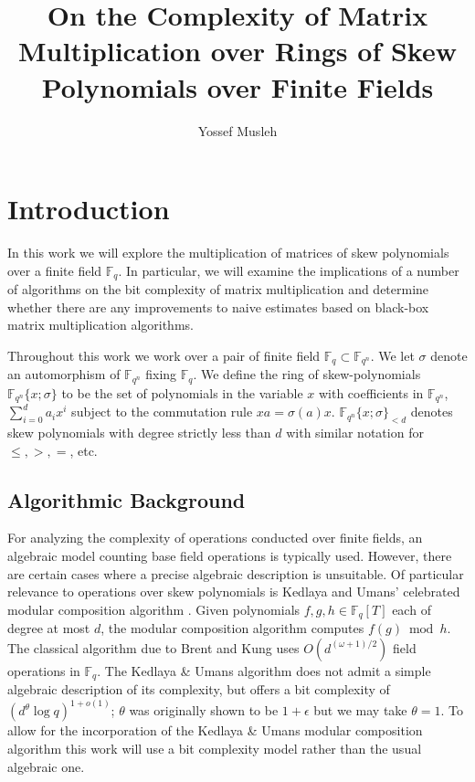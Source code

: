 \documentclass[9pt]{article}
\title{On the Complexity of Matrix Multiplication over Rings of Skew Polynomials over Finite Fields}
\author{Yossef Musleh}
\date{}
\theoremstyle{plain}
\theoremstyle{definition}
\theoremstyle{remark}
\newcommand{\F}{\mathbb{F}}
\newcommand{\sring}{\F_{q^n}\{x; \sigma\}}
\begin{document}
\maketitle

\section{Introduction}

In this work we will explore the multiplication of matrices of skew polynomials over a finite field $\mathbb{F}_q$. In particular, we will examine the implications of a number of algorithms on the bit complexity of matrix multiplication and determine whether there are any improvements to naive estimates based on black-box matrix multiplication algorithms.


Throughout this work we work over a pair of finite field $\F_{q} \subset \F_{q^n}$. We let $\sigma$ denote an automorphism of $\F_{q^n}$ fixing $\F_q$. We define the ring of skew-polynomials $\F_{q^n}\{x; \sigma\}$ to be the set of polynomials in the variable $x$ with coefficients in $\F_{q^n}$, $\sum_{i=0}^d a_i x^i$ subject to the commutation rule $xa = \sigma(a)x$. $\sring_{<d}$ denotes skew polynomials with degree strictly less than $d$ with similar notation for $\leq, >, =$, etc.

\subsection{Algorithmic Background}

For analyzing the complexity of operations conducted over finite fields, an algebraic model counting base field operations is typically used. However, there are certain cases where a precise algebraic description is unsuitable. Of particular relevance to operations over skew polynomials is Kedlaya and Umans' celebrated modular composition algorithm \cite{KedUman}. Given polynomials $f, g, h \in \F_{q}[T]$ each of degree at most $d$, the modular composition algorithm computes $f(g) \bmod h$. The classical algorithm due to Brent and Kung uses $O(d^{(\omega + 1)/2})$ field operations in $\F_{q}$. The Kedlaya \& Umans algorithm does not admit a simple algebraic description of its complexity, but offers a bit complexity of $(d^{\theta} \log q)^{1+o(1)}$; $\theta$ was originally shown to be $1 + \epsilon$ but we may take $\theta = 1$. To allow for the incorporation of the Kedlaya \& Umans modular composition algorithm this work will use a bit complexity model rather than the usual algebraic one. 
\end{document}
